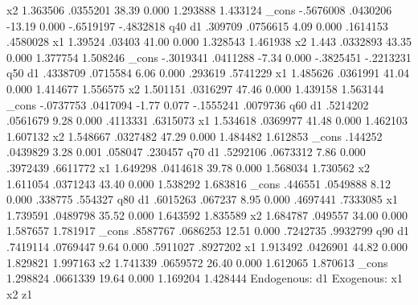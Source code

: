           x2 {\VBAR}   1.363506   .0355201    38.39   0.000     1.293888    1.433124
       _cons {\VBAR}  -.5676008   .0430206   -13.19   0.000    -.6519197   -.4832818
q40          {\VBAR}
          d1 {\VBAR}    .309709   .0756615     4.09   0.000     .1614153    .4580028
          x1 {\VBAR}    1.39524     .03403    41.00   0.000     1.328543    1.461938
          x2 {\VBAR}      1.443   .0332893    43.35   0.000     1.377754    1.508246
       _cons {\VBAR}  -.3019341   .0411288    -7.34   0.000    -.3825451   -.2213231
q50          {\VBAR}
          d1 {\VBAR}   .4338709   .0715584     6.06   0.000      .293619    .5741229
          x1 {\VBAR}   1.485626   .0361991    41.04   0.000     1.414677    1.556575
          x2 {\VBAR}   1.501151   .0316297    47.46   0.000     1.439158    1.563144
       _cons {\VBAR}  -.0737753   .0417094    -1.77   0.077    -.1555241    .0079736
q60          {\VBAR}
          d1 {\VBAR}   .5214202   .0561679     9.28   0.000     .4113331    .6315073
          x1 {\VBAR}   1.534618   .0369977    41.48   0.000     1.462103    1.607132
          x2 {\VBAR}   1.548667   .0327482    47.29   0.000     1.484482    1.612853
       _cons {\VBAR}    .144252   .0439829     3.28   0.001      .058047     .230457
q70          {\VBAR}
          d1 {\VBAR}   .5292106   .0673312     7.86   0.000     .3972439    .6611772
          x1 {\VBAR}   1.649298   .0414618    39.78   0.000     1.568034    1.730562
          x2 {\VBAR}   1.611054   .0371243    43.40   0.000     1.538292    1.683816
       _cons {\VBAR}    .446551   .0549888     8.12   0.000      .338775     .554327
q80          {\VBAR}
          d1 {\VBAR}   .6015263    .067237     8.95   0.000     .4697441    .7333085
          x1 {\VBAR}   1.739591   .0489798    35.52   0.000     1.643592    1.835589
          x2 {\VBAR}   1.684787    .049557    34.00   0.000     1.587657    1.781917
       _cons {\VBAR}   .8587767   .0686253    12.51   0.000     .7242735    .9932799
q90          {\VBAR}
          d1 {\VBAR}   .7419114   .0769447     9.64   0.000     .5911027    .8927202
          x1 {\VBAR}   1.913492   .0426901    44.82   0.000     1.829821    1.997163
          x2 {\VBAR}   1.741339   .0659572    26.40   0.000     1.612065    1.870613
       _cons {\VBAR}   1.298824   .0661339    19.64   0.000     1.169204    1.428444
Endogenous: d1
 Exogenous: x1 x2 z1
{\smallskip}
